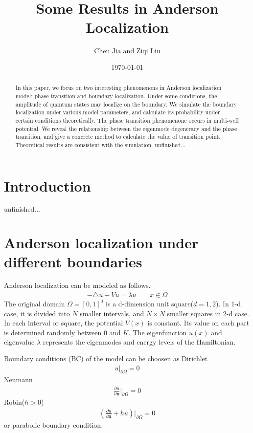 \documentclass[12pt,a4paper]{article}
\title{Some Results in Anderson Localization}
\author{Chen Jia and Ziqi Liu}
\date{\today}
\begin{document}
\maketitle

\begin{abstract}
In this paper, we focus on two interesting phenomenons in Anderson localization model: phase transition and boundary localization. Under some conditions, the amplitude of quantum states may localize on the boundary. We simulate the boundary localization under various model parameters, and calculate its probability under certain conditions theoretically. The phase transition phenomenone occurs in multi-well potential. We reveal the relationship between the eigenmode degeneracy and the phase transition, and give a concrete method to calculate the value of transition point. Theoretical results are consistent with the simulation.
{\color{red} unfinished...}
\end{abstract}

\section{Introduction}

{\color{red} unfinished...}

\section{Anderson localization under different boundaries}\label{sec:problem}

Anderson localization can be modeled as follows.
\begin{align}\label{eq:eigenproblem}
- \triangle u + V u  = \lambda u \qquad x \in \Omega
\end{align}
The original domain $\Omega = [0,1]^d$ is a d-dimension unit square($d = 1, 2$). In 1-d case, it is divided into $N$ smaller intervals, and $N \times N$ smaller squares in 2-d case. In each interval or square, the potential $V(x)$ is constant. Its value on each part is determined randomly between $0$ and $K$. The eigenfunction $u(x)$ and eigenvalue $\lambda$ represents the eigenmodes and energy levels of the Hamiltonian.

Boundary conditions (BC) of the model can be choosen as Dirichlet
\begin{align}\label{eq:Dirichlet}
u|_{\partial \Omega} = 0
\end{align}
Neumann
\begin{align}\label{eq:Neumann}
\frac{\partial u}{\partial \mathbf{n}}|_{\partial \Omega} = 0
\end{align}
Robin($h > 0$)
\begin{align}\label{eq:Robin}
(\frac{\partial u}{\partial \mathbf{n}} + h u)|_{\partial \Omega} = 0
\end{align}
or parabolic boundary condition.
\end{document}
